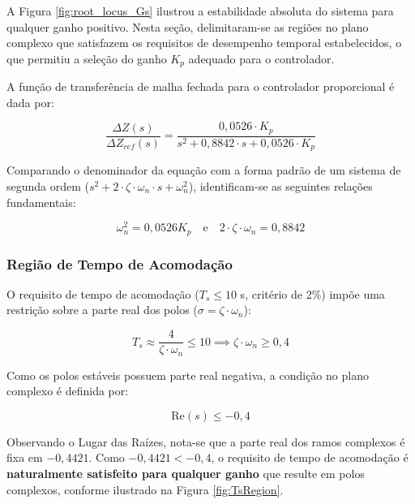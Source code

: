 \documentclass[12pt, a4paper]{article}
\begin{document}
			A Figura \ref{fig:root_locus_Gs} ilustrou a estabilidade absoluta do sistema para qualquer ganho positivo. Nesta seção, delimitaram-se as regiões no plano complexo que satisfazem os requisitos de desempenho temporal estabelecidos, o que permitiu a seleção do ganho $K_p$ adequado para o controlador.

			A função de transferência de malha fechada para o controlador proporcional é dada por:

			\begin{equation}
				\frac{\Delta Z(s)}{\Delta Z_{ref}(s)} = \frac{0,0526 \cdot K_p}{s^2 + 0,8842 \cdot s + 0,0526 \cdot K_p}
			\end{equation}

			Comparando o denominador da equação com a forma padrão de um sistema de segunda ordem ($s^2 + 2 \cdot \zeta \cdot \omega_n \cdot s + \omega_n^2$), identificam-se as seguintes relações fundamentais:

			\begin{equation}
				\omega_n^2 = 0,0526K_p \quad \text{e} \quad 2 \cdot \zeta \cdot \omega_n = 0,8842
				\label{eq:params_mf}
			\end{equation}

			\subsubsection{Região de Tempo de Acomodação}

				O requisito de tempo de acomodação ($T_s \le 10$ s, critério de 2\%) impõe uma restrição sobre a parte real dos polos ($\sigma = \zeta \cdot \omega_n$):

				\begin{equation}
					T_s \approx \frac{4}{\zeta \cdot \omega_n} \le 10 \implies \zeta \cdot \omega_n \ge 0,4
				\end{equation}

				Como os polos estáveis possuem parte real negativa, a condição no plano complexo é definida por:

				\begin{equation}
					\text{Re}(s) \le -0,4
				\end{equation}

				Observando o Lugar das Raízes, nota-se que a parte real dos ramos complexos é fixa em $-0,4421$. Como $-0,4421 < -0,4$, o requisito de tempo de acomodação é \textbf{naturalmente satisfeito para qualquer ganho} que resulte em polos complexos, conforme ilustrado na Figura \ref{fig:TsRegion}.
\end{document}
